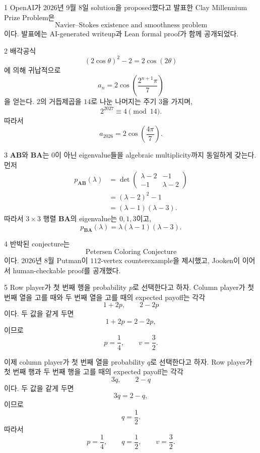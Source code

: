 \documentclass[11pt,oneside]{article}
\begin{document}

\begin{problemsolution}{1}
OpenAI가 2026년 9월 8일 solution을 proposed했다고 발표한 Clay Millennium Prize Problem은
\[
    \boxed{\text{Navier--Stokes existence and smoothness problem}}
\]
이다. 발표에는 AI-generated writeup과 Lean formal proof가 함께 공개되었다.
\end{problemsolution}

\begin{problemsolution}{2}
배각공식
\[
    (2\cos\theta)^2-2=2\cos(2\theta)
\]
에 의해 귀납적으로
\[
    a_n
    =
    2\cos\left(\frac{2^{n+1}\pi}{7}\right)
\]
을 얻는다. $2$의 거듭제곱을 $14$로 나눈 나머지는 주기 $3$을 가지며,
\[
    2^{2027}\equiv4\pmod{14}.
\]
따라서
\[
    \boxed{a_{2026}=2\cos\left(\frac{4\pi}{7}\right)}.
\]
\end{problemsolution}

\begin{problemsolution}{3}
$\mathbf{A}\mathbf{B}$와 $\mathbf{B}\mathbf{A}$는 $0$이 아닌 eigenvalue들을 algebraic multiplicity까지 동일하게 갖는다. 먼저
\[
    \begin{aligned}
        p_{\mathbf{A}\mathbf{B}}(\lambda)
        &=
        \det\!\begin{pmatrix}
            \lambda-2&-1\\
            -1&\lambda-2
        \end{pmatrix}\\
        &=(\lambda-2)^2-1\\
        &=(\lambda-1)(\lambda-3).
    \end{aligned}
\]
따라서 $3\times3$ 행렬 $\mathbf{B}\mathbf{A}$의 eigenvalue는 $0,1,3$이고,
\[
    \boxed{
        p_{\mathbf{B}\mathbf{A}}(\lambda)
        =
        \lambda(\lambda-1)(\lambda-3)
    }.
\]
\end{problemsolution}

\begin{problemsolution}{4}
반박된 conjecture는
\[
    \boxed{\text{Petersen Coloring Conjecture}}
\]
이다. 2026년 8월 Putman이 $112$-vertex counterexample을 제시했고, Jooken이 이어서 human-checkable proof를 공개했다.
\end{problemsolution}

\begin{problemsolution}{5}
Row player가 첫 번째 행을 probability $p$로 선택한다고 하자. Column player가 첫 번째 열을 고를 때와 두 번째 열을 고를 때의 expected payoff는 각각
\[
    1+2p,
    \qquad
    2-2p
\]
이다. 두 값을 같게 두면
\[
    1+2p=2-2p,
\]
이므로
\[
    p=\frac14,
    \qquad
    v=\frac32.
\]

이제 column player가 첫 번째 열을 probability $q$로 선택한다고 하자. Row player가 첫 번째 행과 두 번째 행을 고를 때의 expected payoff는 각각
\[
    3q,
    \qquad
    2-q
\]
이다. 두 값을 같게 두면
\[
    3q=2-q,
\]
이므로
\[
    q=\frac12.
\]
따라서
\[
    \boxed{
        p=\frac14,
        \qquad
        q=\frac12,
        \qquad
        v=\frac32
    }.
\]
\end{problemsolution}
\end{document}
